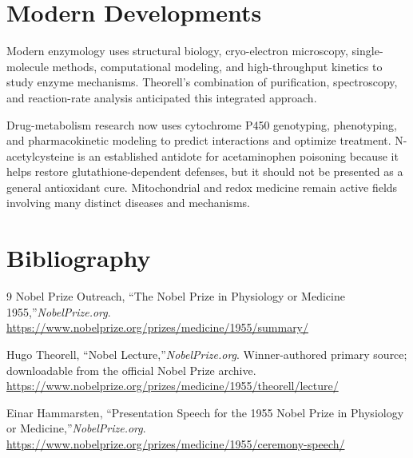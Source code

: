 \section{Modern Developments}

Modern enzymology uses structural biology, cryo-electron microscopy, single-molecule methods, computational modeling, and high-throughput kinetics to study enzyme mechanisms. Theorell's combination of purification, spectroscopy, and reaction-rate analysis anticipated this integrated approach.

Drug-metabolism research now uses cytochrome P450 genotyping, phenotyping, and pharmacokinetic modeling to predict interactions and optimize treatment. N-acetylcysteine is an established antidote for acetaminophen poisoning because it helps restore glutathione-dependent defenses, but it should not be presented as a general antioxidant cure. Mitochondrial and redox medicine remain active fields involving many distinct diseases and mechanisms.

\section{Bibliography}

\begin{thebibliography}{9}
Nobel Prize Outreach, ``The Nobel Prize in Physiology or Medicine 1955,''\emph{NobelPrize.org}.\\
\url{https://www.nobelprize.org/prizes/medicine/1955/summary/}

Hugo Theorell, ``Nobel Lecture,''\emph{NobelPrize.org}. Winner-authored primary source; downloadable from the official Nobel Prize archive.\\
\url{https://www.nobelprize.org/prizes/medicine/1955/theorell/lecture/}

Einar Hammarsten, ``Presentation Speech for the 1955 Nobel Prize in Physiology or Medicine,''\emph{NobelPrize.org}.\\
\url{https://www.nobelprize.org/prizes/medicine/1955/ceremony-speech/}
\end{thebibliography}
